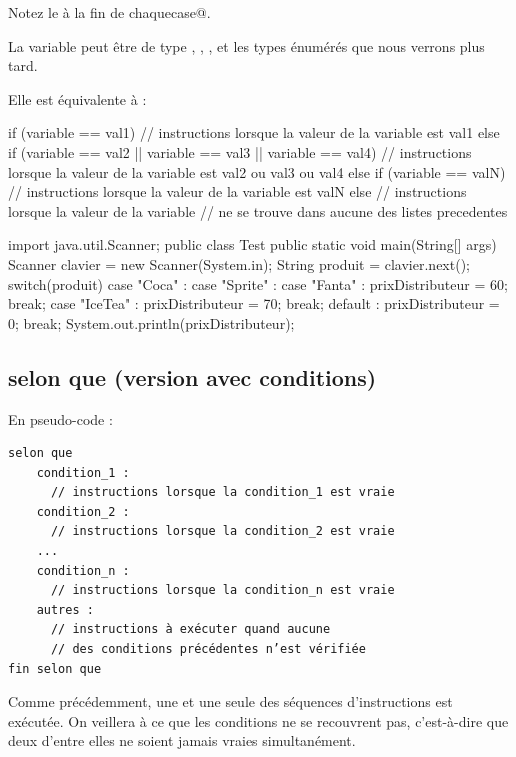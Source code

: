 \documentclass[11pt,a4paper]{article}
\begin{document}
        Notez le \verb@break@ \`a la fin de chaque\verb@ case@.
      
            \par
        
        La variable peut \^etre de type \verb@byte@, \verb@short@, 
        \verb@char@, \verb@int@\verb@String@ et 
        les types \'enum\'er\'es que nous verrons plus tard.
      
            \par
        
        Elle est \'equivalente \`a : 
      
            \par
        \begin{Java}
if (variable == val1){
      // instructions lorsque la valeur de la variable est val1
} else if (variable ==  val2 || variable ==  val3 || variable == val4){
      // instructions lorsque la valeur de la variable est val2 ou val3 ou val4
} else if (variable == valN){
      // instructions lorsque la valeur de la variable est valN
} else {
      // instructions lorsque la valeur de la variable
      // ne se trouve dans aucune des listes precedentes
}      \end{Java}\begin{Java}
import java.util.Scanner;
public class Test{
  public static void main(String[] args){
      Scanner clavier = new Scanner(System.in);
      String produit = clavier.next();
      switch(produit) {
        case "Coca" :
        case "Sprite" :
        case "Fanta" :
        prixDistributeur = 60;
        break;
      case "IceTea" :
        prixDistributeur = 70;
        break;
      default :
        prixDistributeur = 0;
        break;
      }
      System.out.println(prixDistributeur);
    }
}
      \end{Java}\subsection{selon que (version avec conditions)}En pseudo-code :
            \par
        \begin{verbatim}
selon que
    condition_1 :
      // instructions lorsque la condition_1 est vraie
    condition_2 :
      // instructions lorsque la condition_2 est vraie
    ...
    condition_n :
      // instructions lorsque la condition_n est vraie
    autres :
      // instructions à exécuter quand aucune
      // des conditions précédentes n’est vérifiée
fin selon que
      \end{verbatim}
        Comme pr\'ec\'edemment, une et une seule des s\'equences d'instructions est ex\'ecut\'ee. On
        veillera \`a ce que les conditions ne se \guillemotleft  recouvrent \guillemotright  pas, c'est-\`a-dire que deux d'entre elles
        ne soient jamais vraies simultan\'ement. 
      
\end{document}
